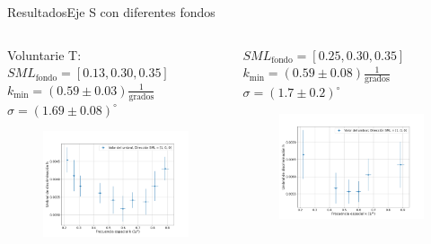 \documentclass[
    11pt, %
    aspectratio=169, %
]{beamer}
\begin{document}
\begin{frame}{Resultados}{Eje S con diferentes fondos}
    \begin{columns}[c] %

    
		\begin{column}{0.50\textwidth} %
        \begin{center}
            Voluntarie T: $SML_\text{fondo} = [0.13, 0.30, 0.35]$\\ $k_{\text{min}} = (0.59 \pm 0.03)\frac{1}{\text{grados}}$ \\ $\sigma = (1.69 \pm 0.08)^\circ$
        \end{center}    
                     \begin{figure}[h!]
                    \centering
                    \includegraphics[angle=0, width=5cm]{Images/resultados/s_yo_gris.png}
                \end{figure}
               
        
               
		\end{column}

    
  		\begin{column}{0.50\textwidth} %
            \begin{center}
                $SML_\text{fondo} = [0.25, 0.30, 0.35]$\\ $k_{\text{min}} = (0.59 \pm 0.08)\frac{1}{\text{grados}}$ \\ $\sigma = (1.7 \pm 0.2)^\circ$
            \end{center}
                 \begin{figure}[h!]
                    \centering
                    \includegraphics[angle=0, width=5cm]{Images/resultados/s_yo_gris_azulado.png}
                \end{figure}
		\end{column}		
	\end{columns}

\end{frame}
\end{document}
